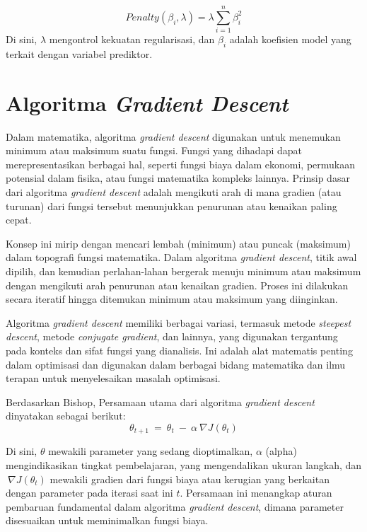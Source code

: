 \begin{equation}\label{penaltyL2}
    Penalty\left( \beta_{i},\lambda \right) = \lambda\sum_{i = 1}^{n}\beta_{i}^{2}
\end{equation}
Di sini, $\lambda$ mengontrol kekuatan regularisasi, dan \(\beta_{i}\) adalah
koefisien model yang terkait dengan variabel prediktor\citep*{Bishop2006}.

\section{Algoritma \emph{Gradient Descent}}
Dalam matematika, algoritma \emph{gradient descent} digunakan untuk
menemukan minimum atau maksimum suatu fungsi. Fungsi yang dihadapi dapat
merepresentasikan berbagai hal, seperti fungsi biaya dalam ekonomi,
permukaan potensial dalam fisika, atau fungsi matematika kompleks
lainnya. Prinsip dasar dari algoritma \emph{gradient descent} adalah
mengikuti arah di mana gradien (atau turunan) dari fungsi tersebut
menunjukkan penurunan atau kenaikan paling cepat.

Konsep ini mirip dengan mencari lembah (minimum) atau puncak (maksimum)
dalam topografi fungsi matematika. Dalam algoritma \emph{gradient
descent}, titik awal dipilih, dan kemudian perlahan-lahan bergerak
menuju minimum atau maksimum dengan mengikuti arah penurunan atau
kenaikan gradien. Proses ini dilakukan secara iteratif hingga ditemukan
minimum atau maksimum yang diinginkan.

Algoritma \emph{gradient descent} memiliki berbagai variasi, termasuk
metode \emph{steepest descent}, metode \emph{conjugate gradient}, dan
lainnya, yang digunakan tergantung pada konteks dan sifat fungsi yang
dianalisis. Ini adalah alat matematis penting dalam optimisasi dan
digunakan dalam berbagai bidang matematika dan ilmu terapan untuk
menyelesaikan masalah optimisasi.
%
\begin{definisi}
    Berdasarkan Bishop\citep*{Bishop2006}, Persamaan utama dari algoritma \emph{gradient
descent} dinyatakan sebagai berikut:
\begin{equation}\label{updateBobot}
    \theta_{t + 1}\  = \ \theta_{t}\  - \ \alpha\ \nabla J\left( \theta_{t} \right)
\end{equation}
\end{definisi}

Di sini, $\theta$ mewakili parameter yang sedang dioptimalkan, \(\alpha\)
(alpha) mengindikasikan tingkat pembelajaran, yang mengendalikan ukuran
langkah, dan\(\ \nabla J\left( \theta_{t} \right)\) mewakili gradien
dari fungsi biaya atau kerugian yang berkaitan dengan parameter pada
iterasi saat ini \(t\). Persamaan ini menangkap aturan pembaruan
fundamental dalam algoritma \emph{gradient descent}, dimana parameter
disesuaikan untuk meminimalkan fungsi biaya.

